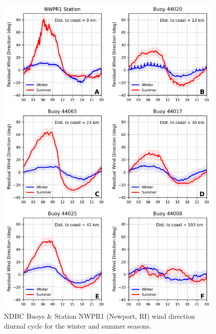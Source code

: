 \begin{figure}[H]
\centering
\includegraphics[width=1.\linewidth]{Figures/Chapter5/wind_dir_diurnal_variability_residuals11.png}
\caption{NDBC Buoys \& Station NWPR1 (Newport, RI) wind direction diurnal cycle for the winter and summer seasons.}
\label{fig:wind_dir_diur_variability}
\end{figure}


